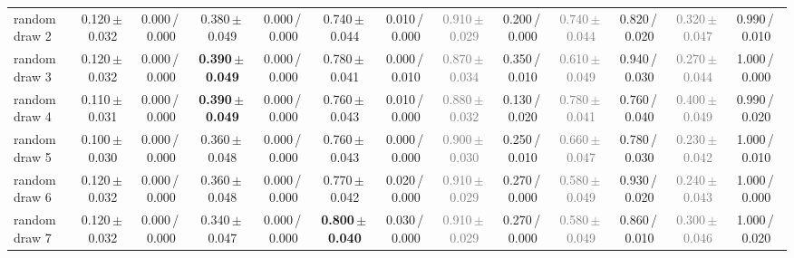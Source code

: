 \begin{tabular}{@{}lcccccccccccc@{}}
random draw 2 & 0.120\,{\scriptsize$\pm$\,0.032} & {\scriptsize 0.000\,/\,0.000} & 0.380\,{\scriptsize$\pm$\,0.049} & {\scriptsize 0.000\,/\,0.000} & 0.740\,{\scriptsize$\pm$\,0.044} & {\scriptsize 0.010\,/\,0.000} & \textcolor{gray}{0.910\,{\scriptsize$\pm$\,0.029}} & {\scriptsize 0.200\,/\,0.000} & \textcolor{gray}{0.740\,{\scriptsize$\pm$\,0.044}} & {\scriptsize 0.820\,/\,0.020} & \textcolor{gray}{0.320\,{\scriptsize$\pm$\,0.047}} & {\scriptsize 0.990\,/\,0.010} \\
random draw 3 & 0.120\,{\scriptsize$\pm$\,0.032} & {\scriptsize 0.000\,/\,0.000} & \textbf{0.390\,{\scriptsize$\pm$\,0.049}} & {\scriptsize 0.000\,/\,0.000} & 0.780\,{\scriptsize$\pm$\,0.041} & {\scriptsize 0.000\,/\,0.010} & \textcolor{gray}{0.870\,{\scriptsize$\pm$\,0.034}} & {\scriptsize 0.350\,/\,0.010} & \textcolor{gray}{0.610\,{\scriptsize$\pm$\,0.049}} & {\scriptsize 0.940\,/\,0.030} & \textcolor{gray}{0.270\,{\scriptsize$\pm$\,0.044}} & {\scriptsize 1.000\,/\,0.000} \\
random draw 4 & 0.110\,{\scriptsize$\pm$\,0.031} & {\scriptsize 0.000\,/\,0.000} & \textbf{0.390\,{\scriptsize$\pm$\,0.049}} & {\scriptsize 0.000\,/\,0.000} & 0.760\,{\scriptsize$\pm$\,0.043} & {\scriptsize 0.010\,/\,0.000} & \textcolor{gray}{0.880\,{\scriptsize$\pm$\,0.032}} & {\scriptsize 0.130\,/\,0.020} & \textcolor{gray}{0.780\,{\scriptsize$\pm$\,0.041}} & {\scriptsize 0.760\,/\,0.040} & \textcolor{gray}{0.400\,{\scriptsize$\pm$\,0.049}} & {\scriptsize 0.990\,/\,0.020} \\
\midrule
random draw 5 & 0.100\,{\scriptsize$\pm$\,0.030} & {\scriptsize 0.000\,/\,0.000} & 0.360\,{\scriptsize$\pm$\,0.048} & {\scriptsize 0.000\,/\,0.000} & 0.760\,{\scriptsize$\pm$\,0.043} & {\scriptsize 0.000\,/\,0.000} & \textcolor{gray}{0.900\,{\scriptsize$\pm$\,0.030}} & {\scriptsize 0.250\,/\,0.010} & \textcolor{gray}{0.660\,{\scriptsize$\pm$\,0.047}} & {\scriptsize 0.780\,/\,0.030} & \textcolor{gray}{0.230\,{\scriptsize$\pm$\,0.042}} & {\scriptsize 1.000\,/\,0.010} \\
random draw 6 & 0.120\,{\scriptsize$\pm$\,0.032} & {\scriptsize 0.000\,/\,0.000} & 0.360\,{\scriptsize$\pm$\,0.048} & {\scriptsize 0.000\,/\,0.000} & 0.770\,{\scriptsize$\pm$\,0.042} & {\scriptsize 0.020\,/\,0.000} & \textcolor{gray}{0.910\,{\scriptsize$\pm$\,0.029}} & {\scriptsize 0.270\,/\,0.000} & \textcolor{gray}{0.580\,{\scriptsize$\pm$\,0.049}} & {\scriptsize 0.930\,/\,0.020} & \textcolor{gray}{0.240\,{\scriptsize$\pm$\,0.043}} & {\scriptsize 1.000\,/\,0.000} \\
random draw 7 & 0.120\,{\scriptsize$\pm$\,0.032} & {\scriptsize 0.000\,/\,0.000} & 0.340\,{\scriptsize$\pm$\,0.047} & {\scriptsize 0.000\,/\,0.000} & \textbf{0.800\,{\scriptsize$\pm$\,0.040}} & {\scriptsize 0.030\,/\,0.000} & \textcolor{gray}{0.910\,{\scriptsize$\pm$\,0.029}} & {\scriptsize 0.270\,/\,0.000} & \textcolor{gray}{0.580\,{\scriptsize$\pm$\,0.049}} & {\scriptsize 0.860\,/\,0.010} & \textcolor{gray}{0.300\,{\scriptsize$\pm$\,0.046}} & {\scriptsize 1.000\,/\,0.020} \\

\end{tabular}
